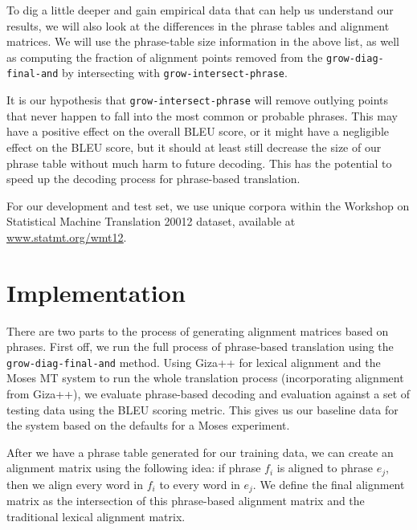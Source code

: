 \documentclass[twocolumn]{article}
\newcommand{\originalAlign}{\texttt{grow-diag-final-and}}
\newcommand{\phraseIntersectAlign}{\texttt{grow-intersect-phrase}}
\begin{document}
To dig a little deeper and gain empirical data that can help us understand our
results, we will also look at the differences in the phrase tables and alignment
matrices. We will use the phrase-table size information in the above list, as
well as computing the fraction of alignment points removed from the
\originalAlign{} by intersecting with \phraseIntersectAlign{}.

It is our hypothesis that \phraseIntersectAlign{} will remove outlying
points that never happen to fall into the most common or probable phrases. This
may have a positive effect on the overall BLEU score, or it might have a
negligible effect on the BLEU score, but it should at least still decrease the
size of our phrase table without much harm to future decoding. This has the
potential to speed up the decoding process for phrase-based translation.

For our development and test set, we use unique corpora within the Workshop on
Statistical Machine Translation 20012 dataset, available at
\href{http://www.statmt.org/wmt12/dev.tgz}
     {\underline{www.statmt.org/wmt12}}.


\section{Implementation}
There are two parts to the process of generating alignment matrices based on
phrases. First off, we run the full process of phrase-based translation using
the \originalAlign{} method. Using Giza++ for lexical alignment and the Moses MT
system to run the whole translation process (incorporating alignment from
Giza++), we evaluate phrase-based decoding and evaluation against a set of
testing data using the BLEU scoring metric. This gives us our baseline data for
the system based on the defaults for a Moses experiment.

After we have a phrase table generated for our training data, we can create an
alignment matrix using the following idea: if phrase $f_i$ is aligned to phrase
$e_j$, then we align every word in $f_i$ to every word in $e_j$. We define the
final alignment matrix as the intersection of this phrase-based alignment matrix
and the traditional lexical alignment matrix.


\end{document}
